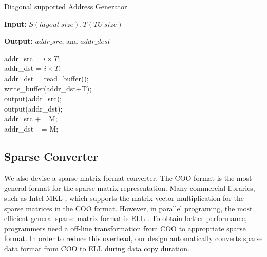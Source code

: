 \documentclass[10pt,journal,compsoc]{IEEEtran}
\begin{document}
\begin{algorithm}[tb]
\caption{Diagonal supported Address Generator}
\footnotesize
\label{algo:DAG}
\textbf{Input:} $  S(layout~size), T(TU~size)$

\textbf{Output:} $ addr\_src$, and $addr\_dest $



            {
                addr\_src = $i \times T$; \\
                {
                    addr\_dst = $i \times T$; \\
                }
                \Else
                {
                    addr\_dst = read\_buffer(); \\
                }
                {
                    {
                        write\_buffer(addr\_dst+T); \\
                    }
                        output(addr\_src); \\
                        output(addr\_dst); \\
                        addr\_src += M; \\
                        addr\_dst += M; \\

                }

            }


\end{algorithm}


\subsection{Sparse Converter}\label{sparse}
We also devise a sparse matrix format converter.
The COO format is the most general format for the sparse matrix representation.
Many commercial libraries, such as Intel MKL \cite{Intel}, which supports
the matrix-vector multiplication for the sparse matrices in the COO format.
However, in parallel programing, the most efficient general sparse matrix format is ELL \cite{spmv_CUDA}.
To obtain better performance, programmers need a off-line transformation from COO to appropriate sparse format.
In order to reduce this overhead, our design automatically converts sparse data format from
COO to ELL during data copy duration.
\end{document}
